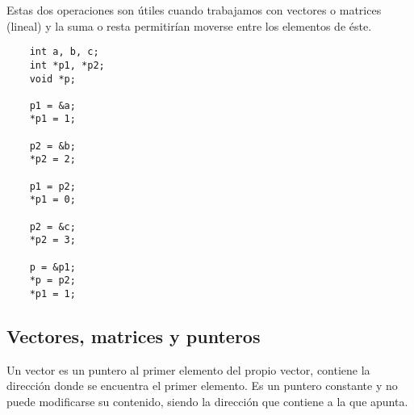 \documentclass[a4paper, 11pt, titlepage]{article}
\begin{document}
    Estas dos operaciones son útiles cuando trabajamos con vectores o matrices (lineal) y la suma
    o resta permitirían moverse entre los elementos de éste.

    \begin{lstlisting}
    int a, b, c;
    int *p1, *p2;
    void *p;

    p1 = &a;
    *p1 = 1;

    p2 = &b;
    *p2 = 2;

    p1 = p2;
    *p1 = 0;

    p2 = &c;
    *p2 = 3;

    p = &p1;
    *p = p2;
    *p1 = 1;
    \end{lstlisting}

    \subsection{Vectores, matrices y punteros}

    Un vector es un puntero al primer elemento del propio vector, contiene la dirección donde
    se encuentra el primer elemento. Es un puntero constante y no puede modificarse su 
    contenido, siendo la dirección que contiene a la que apunta.
\end{document}
